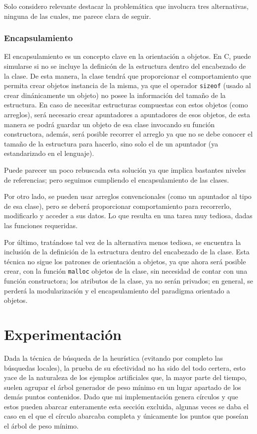 \documentclass[a4paper]{report}
\begin{document}
  Solo considero relevante destacar la problem\'atica que involucra tres alternativas, ninguna
  de las cuales, me parece clara de seguir.

  \subsection{Encapsulamiento}
  El encapsulamiento es un concepto clave en la orientaci\'on a objetos. En C, puede simularse
  si no se incluye la definic\'on de la estructura dentro del encabezado de la clase. De esta
  manera, la clase tendr\'a que proporcionar el comportamiento que permita crear objetos instancia
  de la misma, ya que el operador \texttt{sizeof} (usado al crear din\'anicamente un objeto)
  no posee la informaci\'on del tama\~no de la estructura. En caso de necesitar estructuras
  compuestas con estos objetos (como arreglos), ser\'a necesario crear apuntadores a apuntadores
  de esos objetos, de esta manera se podr\'a guardar un objeto de esa clase invocando
  su funci\'on constructora, adem\'as, ser\'a posible recorrer el arreglo ya que no se debe
  conocer el tama\~no de la estructura para hacerlo, sino solo el de un apuntador (ya estandarizado
  en el lenguaje).

  Puede parecer un poco rebuscada esta soluci\'on ya que implica bastantes niveles de referencias;
  pero seguimos cumpliendo el encapsulamiento de las clases.

  Por otro lado, se pueden usar arreglos convencionales (como un apuntador al tipo de esa clase),
  pero se deber\'a proporcionar comportamiento para recorrerlo, modificarlo y acceder a sus datos.
  Lo que resulta en una tarea muy tediosa, dadas las funciones requeridas.

  Por \'ultimo, trat\'andose tal vez de la alternativa menos tediosa, se encuentra la inclusi\'on
  de la definici\'on de la estructura dentro del encabezado de la clase. Esta t\'ecnica no sigue
  los patrones de orientaci\'on a objetos, ya que ahora ser\'a posible crear, con la funci\'on
  \texttt{malloc} objetos de la clase, sin necesidad de contar con una funci\'on constructora;
  los atributos de la clase, ya no ser\'an privados; en general, se perder\'a la modularizaci\'on
  y el encapsulamiento del paradigma orientado a objetos.

  \chapter{Experimentaci\'on}
  Dada la t\'ecnica de b\'usqueda de la heur\'istica (evitando por completo las b\'usquedas locales),
  la prueba de su efectividad no ha sido del todo certera, esto yace de la naturaleza de los ejemplos
  artificiales que, la mayor parte del tiempo, suelen agrupar el \'arbol generador de peso m\'inimo
  en un lugar apartado de los dem\'as puntos contenidos. Dado que mi implementaci\'on genera
  c\'irculos y que estos pueden abarcar enteramente esta secci\'on excluida, algunas veces se daba
  el caso en el que el c\'irculo abarcaba completa y \'unicamente los puntos que pose\'ian el
  \'arbol de peso m\'inimo.
\end{document}
